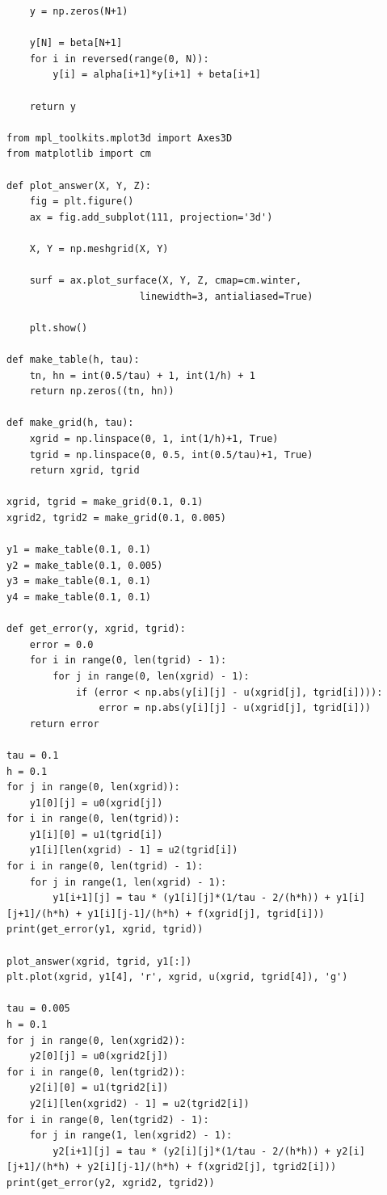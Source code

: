 \documentclass{article}%
\begin{document}
\begin{enumerate}
\begin{scriptsize}
\begin{verbatim}
    y = np.zeros(N+1)
    
    y[N] = beta[N+1]
    for i in reversed(range(0, N)):
        y[i] = alpha[i+1]*y[i+1] + beta[i+1]
        
    return y

from mpl_toolkits.mplot3d import Axes3D
from matplotlib import cm

def plot_answer(X, Y, Z):
    fig = plt.figure()
    ax = fig.add_subplot(111, projection='3d')

    X, Y = np.meshgrid(X, Y)

    surf = ax.plot_surface(X, Y, Z, cmap=cm.winter,
                       linewidth=3, antialiased=True)

    plt.show()

def make_table(h, tau):
    tn, hn = int(0.5/tau) + 1, int(1/h) + 1
    return np.zeros((tn, hn))

def make_grid(h, tau):
    xgrid = np.linspace(0, 1, int(1/h)+1, True)
    tgrid = np.linspace(0, 0.5, int(0.5/tau)+1, True)
    return xgrid, tgrid

xgrid, tgrid = make_grid(0.1, 0.1)
xgrid2, tgrid2 = make_grid(0.1, 0.005)

y1 = make_table(0.1, 0.1)
y2 = make_table(0.1, 0.005)
y3 = make_table(0.1, 0.1)
y4 = make_table(0.1, 0.1)

def get_error(y, xgrid, tgrid):
    error = 0.0
    for i in range(0, len(tgrid) - 1):
        for j in range(0, len(xgrid) - 1):
            if (error < np.abs(y[i][j] - u(xgrid[j], tgrid[i]))):
                error = np.abs(y[i][j] - u(xgrid[j], tgrid[i]))
    return error

tau = 0.1
h = 0.1
for j in range(0, len(xgrid)):
    y1[0][j] = u0(xgrid[j])  
for i in range(0, len(tgrid)):
    y1[i][0] = u1(tgrid[i])
    y1[i][len(xgrid) - 1] = u2(tgrid[i])   
for i in range(0, len(tgrid) - 1):
    for j in range(1, len(xgrid) - 1):
        y1[i+1][j] = tau * (y1[i][j]*(1/tau - 2/(h*h)) + y1[i][j+1]/(h*h) + y1[i][j-1]/(h*h) + f(xgrid[j], tgrid[i]))
print(get_error(y1, xgrid, tgrid))

plot_answer(xgrid, tgrid, y1[:])
plt.plot(xgrid, y1[4], 'r', xgrid, u(xgrid, tgrid[4]), 'g')

tau = 0.005
h = 0.1
for j in range(0, len(xgrid2)):
    y2[0][j] = u0(xgrid2[j])
for i in range(0, len(tgrid2)):
    y2[i][0] = u1(tgrid2[i])
    y2[i][len(xgrid2) - 1] = u2(tgrid2[i])  
for i in range(0, len(tgrid2) - 1):
    for j in range(1, len(xgrid2) - 1):
        y2[i+1][j] = tau * (y2[i][j]*(1/tau - 2/(h*h)) + y2[i][j+1]/(h*h) + y2[i][j-1]/(h*h) + f(xgrid2[j], tgrid2[i]))
print(get_error(y2, xgrid2, tgrid2))


\end{verbatim}
\end{scriptsize}
\end{enumerate}
\end{document}
